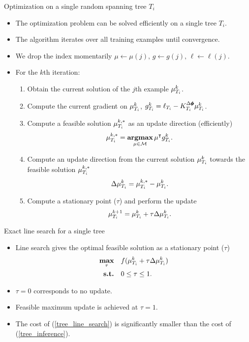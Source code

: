 \documentclass[first=dgreen,second=purple,logo=yellowexc]{aaltoslides}
\begin{document}
\begin{frame}{Optimization on a single random spanning tree $T_i$}
	\begin{itemize}\footnotesize
		\item The optimization problem can be solved efficiently on a single tree $T_i$. 
		\item The algorithm iterates over all training examples until convergence.
		\item We drop the index momentarily $\mu\leftarrow\mu(j),\,g\leftarrow g(j),\,\ell\leftarrow\ell(j)$.
		\item For the $k$th iteration:
		\begin{enumerate}\footnotesize
			\item Obtain the current solution of the $j$th example $\mathbf {\mu}_{T_i}^k$.
			\item Compute the current gradient on $\mathbf {\mu}_{T_i}^k$, $g_{T_i}^k = \ell_{T_i} - K^{\Delta\pmb \phi}_{T_i}\mathbf {\mu}_{T_i}^k$.
			\item Compute a feasible solution ${\mathbf {\mu}}_{T_i}^{k,*}$ as an update direction ({\color{aaltored}efficiently})
			\begin{align}
				{\mathbf {\mu}}_{T_i}^{k,*} = \underset{\mathbf {\mu}\in\mathcal{M}}{\textbf{argmax}}\,\mathbf {\mu}^{\intercal} g_{T_i}^k. \label{tree_inference}
			\end{align}
			\item Compute an update direction from the current solution ${\mathbf {\mu}}_{T_i}^{k}$ towards the feasible solution ${\mathbf {\mu}}_{T_i}^{k,*}$
			\begin{align*}
				\Delta\mathbf {\mu}_{T_i}^{k} = {\mathbf {\mu}}_{T_i}^{k,*} - {\mathbf {\mu}}_{T_i}^{k}.
			\end{align*}
			\item Compute a stationary point ($\tau$) and perform the update
			\begin{align*}
				\mathbf {\mu}_{T_i}^{k+1} = \mathbf {\mu}_{T_i}^k + \tau\Delta\mathbf {\mu}_{T_i}^{k}.
			\end{align*}
		\end{enumerate}
	\end{itemize}
\end{frame}

\begin{frame}{Exact line search for a single tree}
	\begin{itemize}
		\item Line search gives the optimal feasible solution as a stationary point ($\tau$)
		\begin{align}
			\underset{\tau}{\textbf{max}} &\quad f(\mathbf {\mu}_{T_i}^k + \tau\Delta\mathbf {\mu}_{T_i}^{k})\label{tree_line_search}\\
			\textbf{s.t.} &\quad 0\le\tau\le1.\nonumber
		\end{align}
		\item $\tau=0$ corresponds to no update.
		\item Feasible maximum update is achieved at $\tau=1$. 
		\item The cost of (\ref{tree_line_search}) is significantly smaller than the cost of (\ref{tree_inference}).
	\end{itemize}
\end{frame}
\end{document}
